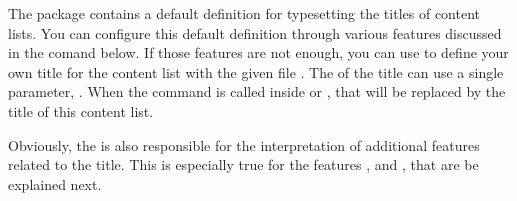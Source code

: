 \begin{Declaration}
\end{Declaration}
The  package contains a default definition for typesetting
the titles of content lists. You can configure this default definition through
various features discussed in the  comand
below. If those features are not enough, you can use 
to define your own title for the content list with the given file
. The  of the title can use a single
parameter, . When the command is called inside
 or ,
that  will be replaced by the title of this content list.

Obviously, the  is also responsible for the interpretation
of additional features related to the title. This is especially true
for the features ,  and ,
that are be explained next.%
\EndIndexGroup


